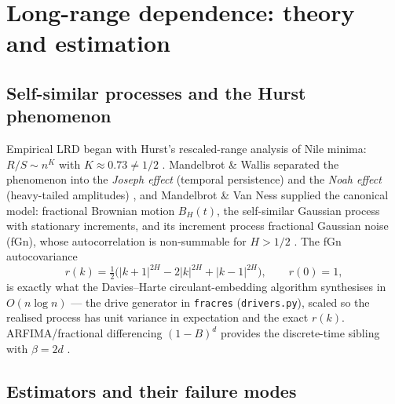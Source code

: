 \documentclass[11pt,a4paper]{article}
\begin{document}
\section{Long-range dependence: theory and estimation}
\label{sec:lrd}

\subsection{Self-similar processes and the Hurst phenomenon}

Empirical LRD began with Hurst's rescaled-range analysis of Nile minima: $R/S
\sim n^{K}$ with $K \approx 0.73 \neq 1/2$ \cite{hurst1951long}. Mandelbrot \&
Wallis separated the phenomenon into the \emph{Joseph effect} (temporal
persistence) and the \emph{Noah effect} (heavy-tailed amplitudes)
\cite{mandelbrot1969noah}, and Mandelbrot \& Van Ness supplied the canonical
model: fractional Brownian motion $B_H(t)$, the self-similar Gaussian process
with stationary increments, and its increment process fractional Gaussian
noise (fGn), whose autocorrelation is non-summable for $H > 1/2$
\cite{mandelbrot1968fractional}. The fGn autocovariance
\begin{equation}
  r(k) = \tfrac{1}{2}\bigl(|k+1|^{2H} - 2|k|^{2H} + |k-1|^{2H}\bigr),
  \qquad r(0) = 1,
  \label{eq:fgn}
\end{equation}
is exactly what the Davies--Harte circulant-embedding algorithm synthesises in
$O(n \log n)$ \cite{davies1987tests} --- the drive generator in
\texttt{fracres} (\texttt{drivers.py}), scaled so the realised process has
unit variance in expectation and the exact $r(k)$. ARFIMA/fractional
differencing $(1-B)^d$ provides the discrete-time sibling with $\beta = 2d$
\cite{granger1980introduction}.

\subsection{Estimators and their failure modes}
\end{document}

